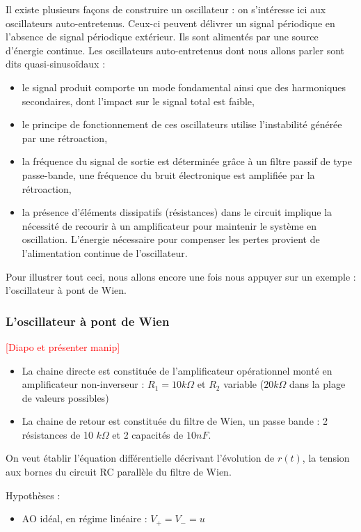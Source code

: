 \documentclass[11pt,a4paper]{report}
\begin{document}
Il existe plusieurs façons de construire un oscillateur : on s'intéresse ici aux oscillateurs auto-entretenus. Ceux-ci peuvent délivrer un signal périodique en l'absence de signal périodique extérieur. Ils sont alimentés par une source d'énergie continue. Les oscillateurs auto-entretenus dont nous allons parler sont dits quasi-sinusoïdaux :
\begin{itemize}
	\item le signal produit comporte un mode fondamental ainsi que des harmoniques secondaires, dont l'impact sur le signal total est faible,
	\item le principe de fonctionnement de ces oscillateurs utilise l'instabilité générée par une rétroaction,
	\item la fréquence du signal de sortie est déterminée grâce à un filtre passif de type passe-bande, une fréquence du bruit électronique est amplifiée par la rétroaction,
	\item la présence d'éléments dissipatifs (résistances) dans le circuit implique la nécessité de recourir à un amplificateur pour maintenir le système en oscillation. L'énergie nécessaire pour compenser les pertes provient de l'alimentation continue de l'oscillateur.
\end{itemize}

Pour illustrer tout ceci, nous allons encore une fois nous appuyer sur un exemple : l'oscillateur à pont de Wien.

\subsubsection{L'oscillateur à pont de Wien}

\textcolor{red}{[Diapo et présenter manip]}

\begin{itemize}
	\item La chaine directe est constituée de l'amplificateur opérationnel monté en amplificateur non-inverseur : $R_1 = 10 k\Omega$ et $R_2$ variable ($20 k\Omega$ dans la plage de valeurs possibles)
	\item La chaine de retour est constituée du filtre de Wien, un passe bande : 2 résistances de 10 $k\Omega$ et 2 capacités de $10 nF$.
\end{itemize}

On veut établir l'équation différentielle décrivant l'évolution de $r(t)$, la tension aux bornes du circuit RC parallèle du filtre de Wien.

Hypothèses :
\begin{itemize}
	\item AO idéal, en régime linéaire : $V_+ = V_- = u$
\end{itemize}
\end{document}
